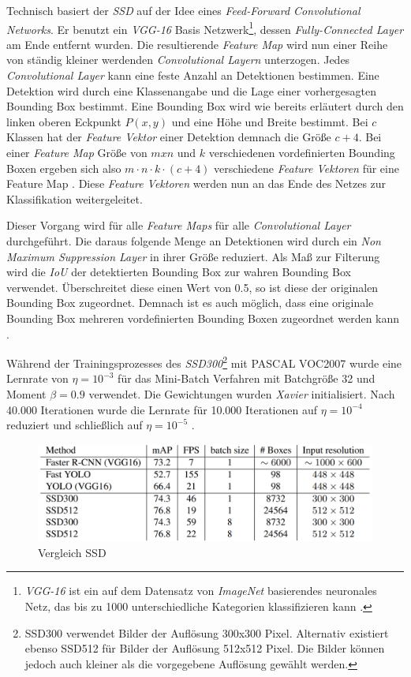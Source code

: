 Technisch basiert der \textit{SSD} auf der Idee eines \textit{Feed-Forward Convolutional Networks}. Er benutzt ein \textit{VGG-16} Basis Netzwerk\footnote{\textit{VGG-16} ist ein auf dem Datensatz von \textit{ImageNet} basierendes neuronales Netz, das bis zu 1000 unterschiedliche Kategorien klassifizieren kann \cite{MathWorks.2019b}.}, dessen \textit{Fully-Connected Layer} am Ende entfernt wurden. Die resultierende \textit{Feature Map} wird nun einer Reihe von ständig kleiner werdenden \textit{Convolutional Layern} unterzogen. Jedes \textit{Convolutional Layer} kann eine feste Anzahl an Detektionen bestimmen. Eine Detektion wird durch eine Klassenangabe und die Lage einer vorhergesagten Bounding Box bestimmt. Eine Bounding Box wird wie bereits erläutert durch den linken oberen Eckpunkt $P(x,y)$ und eine Höhe und Breite bestimmt. Bei $c$ Klassen hat der \textit{Feature Vektor} einer Detektion demnach die Größe $c+4$. Bei einer \textit{Feature Map} Größe von $m x n$ und $k$ verschiedenen vordefinierten Bounding Boxen ergeben sich also $m \cdot n \cdot k \cdot (c+4)$ verschiedene \textit{Feature Vektoren} für eine Feature Map \cite{ssd.20161229}. Diese \textit{Feature Vektoren} werden nun an das Ende des Netzes zur Klassifikation weitergeleitet.

Dieser Vorgang wird für alle \textit{Feature Maps} für alle \textit{Convolutional Layer} durchgeführt. Die daraus folgende Menge an Detektionen wird durch ein \textit{Non Maximum Suppression Layer} in ihrer Größe reduziert. Als Maß zur Filterung wird die \textit{IoU} der detektierten Bounding Box zur wahren Bounding Box verwendet. Überschreitet diese einen Wert von 0.5, so ist diese der originalen Bounding Box zugeordnet. Demnach ist es auch möglich, dass eine originale Bounding Box mehreren vordefinierten Bounding Boxen zugeordnet werden kann \cite{ssd.20161229}.

Während der Trainingsprozesses des \textit{SSD300}\footnote{SSD300 verwendet Bilder der Auflösung 300x300 Pixel. Alternativ existiert ebenso SSD512 für Bilder der Auflösung 512x512 Pixel. Die Bilder können jedoch auch kleiner als die vorgegebene Auflösung gewählt werden.} mit PASCAL VOC2007 wurde eine Lernrate von $\eta = 10^{-3}$ für das Mini-Batch Verfahren mit Batchgröße 32 und Moment $\beta = 0.9$ verwendet. Die Gewichtungen wurden \textit{Xavier} initialisiert. Nach 40.000 Iterationen wurde die Lernrate für 10.000 Iterationen auf $\eta = 10^{-4}$ reduziert und schließlich auf $\eta = 10^{-5}$ \cite{ssd.20161229}. 

\begin{figure}[ht]
	\begin{center}
		\includegraphics[width=12cm]{Bilder/ssd_results.png} 
		\caption[Vergleich SSD]{Vergleich SSD \cite{ssd.20161229}}
		\label{result}
	\end{center}
\end{figure}

